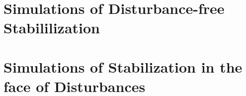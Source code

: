\documentclass[a4paper,11pt,twoside]{book}
\begin{document}
    
    
    
    

  \chapter{Simulations of Disturbance-free Stabililization}
    \label{chapter:simulations_without_disturbances}

    
    

  \chapter{Simulations of Stabilization in the face of Disturbances}
    \label{chapter:simulations_with_disturbances}

    
    
\end{document}
